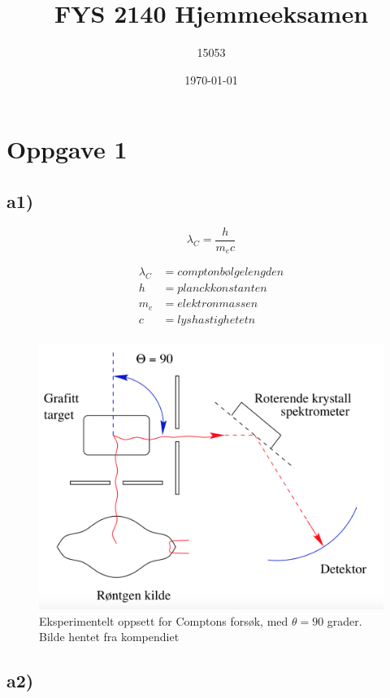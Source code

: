 \documentclass[norsk,a4paper,12pt]{article}
\title{FYS 2140 Hjemmeeksamen}
\author{15053}
\date{\today}
\begin{document}
\maketitle



\section*{Oppgave 1}

\subsection*{a1)}

\begin{equation}
\lambda_C = \frac{h}{m_ec}
\end{equation}


\begin{align*}
\lambda_C &= comptonbølgelengden \\
h &= planckkonstanten \\
m_e &= elektronmassen \\
c &= lyshastighetetn \\
\end{align*}


\begin{figure}[h]
\includegraphics[scale=0.4]{compton}
\caption{Eksperimentelt oppsett for Comptons forsøk, med $\theta =90$ grader. Bilde hentet fra kompendiet}
\label{fig:compton}
\end{figure}

\subsection*{a2)}
\end{document}
